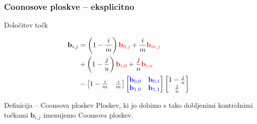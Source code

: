 \documentclass{beamer}
\begin{document}
\begin{frame}
    \frametitle{Coonosove ploskve -- eksplicitno}
    \begin{block}{Določitev točk}
    
        \begin{align*}
            \mathbf{b}_{i,j} &= \left(1 - \frac{i}{m}\right) \color{red} \mathbf{b}_{0,j} \color{black}+\frac{i}{m}\color{red}\mathbf{b}_{m,j}\\
             &+ \left(1 - \frac{j}{n}\right)\color{red}\mathbf{b}_{i,0} \color{black}+\frac{j}{n} \color{red}\mathbf{b}_{i,n}\ \\
            &- 
            \begin{bmatrix} 
               1 - \frac{i}{m} & \frac{i}{m}
            \end{bmatrix}
            \begin{bmatrix} 
                \color{blue} \mathbf{b}_{0,0} &  \color{blue} \mathbf{b}_{0,1}\\
                \color{blue} \mathbf{b}_{1,0} &  \color{blue} \mathbf{b}_{1,1}
            \end{bmatrix}
            \begin{bmatrix}
               1 - \frac{j}{n}\\
               \frac{j}{n}
            \end{bmatrix}
         \end{align*}
\end{block}
    

\begin{block}{Definicija -- Coonsova ploskev}
    Ploskev, ki jo dobimo s tako dobljenimi kontrolnimi točkami $\mathbf{b}_{i,j}$
imenujemo Coonsova ploskev.

\end{block}

\end{frame}
\end{document}
